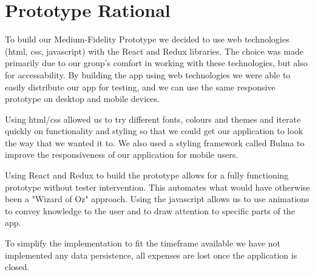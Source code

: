 \documentclass{chi2011}
\begin{document}
	\section{Prototype Rational}

    To build our Medium-Fidelity Prototype we decided to use web technologies
    (html, css, javascript) with the React and Redux libraries. The choice was made primarily
    due to our group's comfort in working with these technologies, but also for accessability.
    By building the app using web technologies we were able to easily distribute our app for testing,
    and we can use the same responsive prototype on desktop and mobile devices.

    Using html/css allowed us to try different fonts, colours and themes
    and iterate quickly on functionality and styling so that we could get our
    application to look the way that we wanted it to. We also used a styling framework
    called Bulma to improve the responsiveness of our application for mobile users.

    Using React and Redux to build the prototype allows for a fully functioning prototype
    without tester intervention. This automates what would have otherwise been a "Wizard of Oz"
    approach. Using the javascript allows us to use animations to convey knowledge to the user
    and to draw attention to specific parts of the app.

    To simplify the implementation to fit the timeframe available we have not implemented any 
    data persistence, all expenses are lost once the application is closed.



\end{document}
